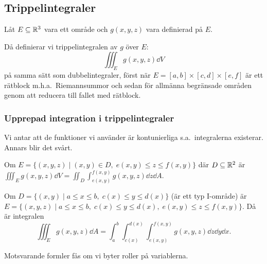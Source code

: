 \documentclass[a4paper]{article}
\begin{document}
\providecommand\fname{}
\renewcommand\fname{19-10-01}

\subsection{Trippelintegraler}
\begin{defn}[Trippelintegraler]
    Låt \(
        E \subseteq \mathbb{R}^3
    \) vara ett område och \(
        g(x,y,z)
    \) vara definierad på \(
        E
    \).   
    
    Då definierar vi trippelintegralen av \(
        g
    \) över \(
        E
    \): \[
        \iiint_E g(x,y,z) \dd V 
    \] på samma sätt som dubbelintegraler, först när \(
        E = [a,b]\times [c,d] \times [e,f]
    \) är ett rätblock m.h.a.\ Riemannsummor och sedan för allmänna 
    begränsade områden genom att reducera till fallet med rätblock. 
\end{defn}

\subsubsection{Upprepad integration i trippelintegraler}
Vi antar att de funktioner vi använder är kontunierliga s.a.\ integralerna 
existerar. Annars blir det svårt.

Om \(
    E = \{ (x,y,z) \; | \; (x,y) \in D, \;e(x,y) \leq z \leq f(x,y) \}
\) där \(
    D \subseteq \mathbb{R}^2
\) är \(
    \iiint_E g(x,y,z) \dd V = \iint_D \int_{e(x,y)}^{f(x,y)} g(x,y,z) \dd z \dd A
\). 

Om \(
    D = \{ (x,y) \; | \; a \leq x \leq b, \; c(x) \leq y \leq d(x) \}
\) (är ett typ I-område) är \(
    E = \{ (x,y,z) \; | \; a\leq x \leq b, \; c(x) \leq y \leq d(x) ,\;e(x,y) \leq z \leq f(x,y) \}
\). Då är integralen \[
    \iiint_E g(x,y,z) \dd A = \int_a^b \int_{c(x)}^{d(x)} \int_{e(x,y)}^{f(x,y)} g(x,y,z) \dd z \dd y \dd x.
\] 

Motsvarande formler fås om vi byter roller på variablerna. 
\end{document}
